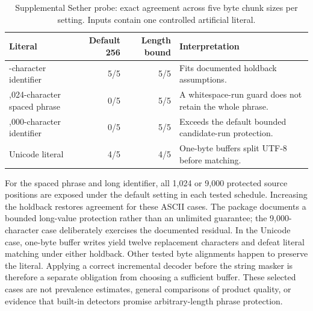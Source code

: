 \documentclass[11pt,a4paper]{article}
\begin{document}
\begin{table}[t]
\centering\small
\caption{Supplemental Sether probe: exact agreement across five byte chunk sizes per setting. Inputs contain one controlled artificial literal.}
\label{tab:sether}
\begin{tabular}{>{\raggedright\arraybackslash}p{.30\linewidth}rr>{\raggedright\arraybackslash}p{.34\linewidth}}\toprule
Literal & Default 256 & Length bound & Interpretation\\\midrule
64-character identifier & 5/5 & 5/5 & Fits documented holdback assumptions.\\
1,024-character spaced phrase & 0/5 & 5/5 & A whitespace-run guard does not retain the whole phrase.\\
9,000-character identifier & 0/5 & 5/5 & Exceeds the default bounded candidate-run protection.\\
Unicode literal & 4/5 & 4/5 & One-byte buffers split UTF-8 before matching.\\\bottomrule
\end{tabular}
\end{table}
For the spaced phrase and long identifier, all 1,024 or 9,000 protected source positions are exposed under the default setting in each tested schedule. Increasing the holdback restores agreement for these ASCII cases. The package documents a bounded long-value protection rather than an unlimited guarantee; the 9,000-character case deliberately exercises the documented residual. In the Unicode case, one-byte buffer writes yield twelve replacement characters and defeat literal matching under either holdback. Other tested byte alignments happen to preserve the literal. Applying a correct incremental decoder before the string masker is therefore a separate obligation from choosing a sufficient buffer. These selected cases are not prevalence estimates, general comparisons of product quality, or evidence that built-in detectors promise arbitrary-length phrase protection.
\end{document}

